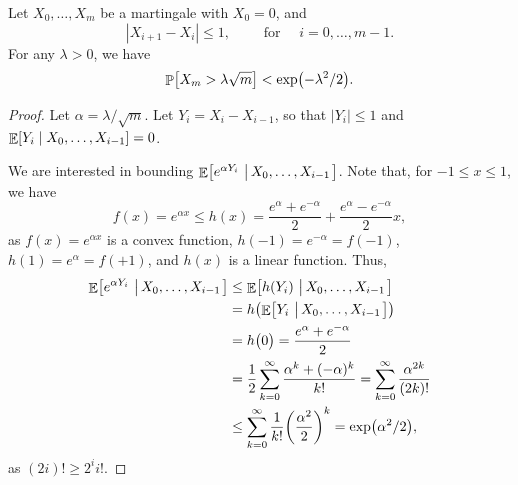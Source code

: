 \begin{theorem}
    Let $ X_0, \ldots, X_m$ be a martingale with $X_0 =0$, and
    \begin{equation*}
        |X_{i+1}-X_i| \leq 1, \qquad\text{ for }\quad i=0, \ldots, m-1.
    \end{equation*}
    For any $\lambda > 0$, we have
    \begin{equation*}
        \Prob{X_m > \lambda \sqrt{m}} <
        \exp\pth{-\lambda^2/2}.
    \end{equation*}
\end{theorem}
\begin{proof}
    Let $\alpha = \lambda / \sqrt{m}$. Let $Y_i = X_i - X_{i-1}$, so
    that $|Y_i| \leq 1$ and
    $\mathop{\mathbb{E}}\!\left[  Y_i  \;\middle\vert\;  X_0, \ldots, X_{i-1} \right] = 0$.

    We are interested in bounding $\mathop{\mathbb{E}}\!\left[ {e^{\alpha Y_i}
       \,\left|\, { X_0, \ldots, X_{i-1}} \bigr.\right.} \right]$. Note that, for $-1
    \leq x \leq 1$, we have
    \begin{equation*}
        f(x)
        =%
        e^{\alpha
           x} \leq h(x) = \frac{e^{\alpha} + e^{-\alpha}}{2} +
        \frac{e^{\alpha} - e^{-\alpha}}{2} x,
    \end{equation*}
    as $f(x) = e^{\alpha x}$ is a convex function,
    $h(-1) = e^{-\alpha} = f(-1)$, $h(1) = e^{\alpha} = f(+1)$, and
    $h(x)$ is a linear function.  Thus,
    \begin{align*}
      \allowdisplaybreaks%
      \Ex{ e^{\alpha Y_i} \sep{ X_0, \ldots, X_{i-1}}}
      &\leq %
        \Ex{ h( Y_i) \sep{ X_0, \ldots, X_{i-1}}}
      \\&%
        =%
        h \pth{ \Ex{ Y_i \sep{ X_0, \ldots, X_{i-1}}}}%
      \\
      &%
        =%
        h\pth{\bigl.  0  }%
        =%
        \frac{e^{\alpha} +e^{-\alpha}}{2}%
      \\&%
      =%
      \frac{1}{2} \sum_{k=0}^\infty \frac{\alpha^k + (-\alpha)^k}{k!}
      =%
      \sum_{k=0}^\infty \frac{\alpha^{2k}}{(2k)!}%
      \\&%
      \leq%
      \sum_{k=0}^\infty \frac{1}{k!} \pth{\frac{\alpha^2}{2}}^k
      =%
      \exp\pth{\alpha^2/2},
    \end{align*}
    as $(2i)! \geq 2^i {}i!$.


\end{proof}
